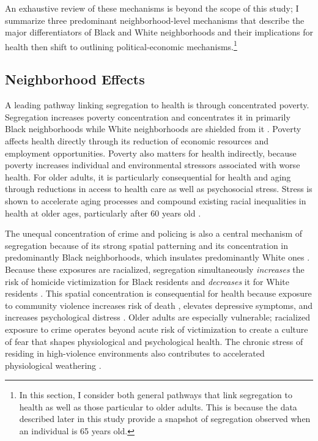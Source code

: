 \documentclass[11pt]{article}
\begin{document}
An exhaustive review of these mechanisms is beyond the scope of this study; I summarize three predominant neighborhood-level mechanisms that describe the major differentiators of Black and White neighborhoods and their implications for health then shift to outlining political-economic mechanisms.\footnote{In this section, I consider both general pathways that link segregation to health as well as those particular to older adults. This is because the data described later in this study provide a snapshot of segregation observed when an individual is 65 years old.}

\subsection{Neighborhood Effects}

A leading pathway linking segregation to health is through concentrated poverty. Segregation increases poverty concentration \citep{massey_american_1993} and concentrates it in primarily Black neighborhoods while White neighborhoods are shielded from it \citep{quillian_segregation_2012, ananat_wrong_2011}. Poverty affects health directly through its reduction of economic resources and employment opportunities. Poverty also matters for health indirectly, because poverty increases individual and environmental stressors associated with worse health. For older adults, it is particularly consequential for health and aging through reductions in access to health care as well as psychosocial stress. Stress is shown to accelerate aging processes \citep{massey_neighborhood_2018} and compound existing racial inequalities in health at older ages, particularly after 60 years old \citep{geronimus_weathering_2006}.

The unequal concentration of crime and policing is also a central mechanism of segregation because of its strong spatial patterning and its concentration in predominantly Black neighborhoods, which insulates predominantly White ones \citep{bell_anti-segregation_2020,light_segregation_2019}. Because these exposures are racialized, segregation simultaneously \textit{increases} the risk of homicide victimization for Black residents and \textit{decreases} it for White residents \citep{light_segregation_2019}. This spatial concentration is consequential for health because exposure to community violence increases risk of death \citep{edwards_risk_2019}, elevates depressive symptoms, and increases psychological distress \citep{foell_exposure_2021}. Older adults are especially vulnerable; racialized exposure to crime operates beyond acute risk of victimization to create a culture of fear \citep{klinenberg_heat_2003} that shapes physiological and psychological health. The chronic stress of residing in high-violence environments also contributes to accelerated physiological weathering \citep{geronimus_weathering_1992}. 
\end{document}
